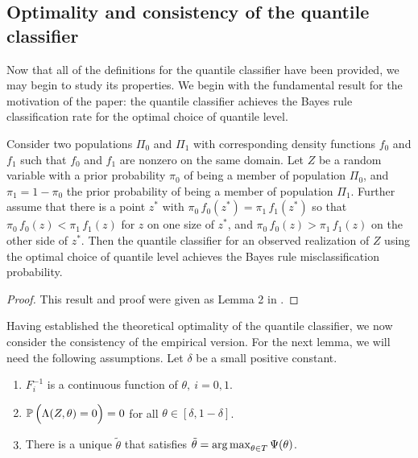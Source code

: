 \subsection{Optimality and consistency of the quantile classifier}
\label{sec:quantile-classifier-optimality}

Now that all of the definitions for the quantile classifier have been provided,
we may begin to study its properties.  We begin with the fundamental result for
the motivation of the paper: the quantile classifier achieves the Bayes rule
classification rate for the optimal choice of quantile level.

\begin{theorem}
  \label{thm:quantile-classifier-is-bayes}
  Consider two populations $\Pi_0$ and $\Pi_1$ with corresponding density
  functions $f_0$ and $f_1$ such that $f_0$ and $f_1$ are nonzero on the same
  domain.  Let $Z$ be a random variable with a prior probability $\pi_0$ of
  being a member of population $\Pi_0$, and $\pi_1 = 1 - \pi_0$ the prior
  probability of being a member of population $\Pi_1$.  Further assume that
  there is a point $z^{*}$ with $\pi_0\, f_0(z^{*}) = \pi_1\, f_1(z^{*})$ so
  that $\pi_0\, f_0(z) < \pi_1\, f_1(z)$ for $z$ on one size of $z^{*}$, and
  $\pi_0\, f_0(z) > \pi_1\, f_1(z)$ on the other side of $z^{*}$.  Then the
  quantile classifier for an observed realization of $Z$ using the optimal
  choice of quantile level achieves the Bayes rule misclassification
  probability.
\end{theorem}

\begin{proof}
  This result and proof were given as Lemma 2 in \cite{hennig2016}.
\end{proof}

Having established the theoretical optimality of the quantile classifier, we now
consider the consistency of the empirical version.  For the next lemma, we will
need the following assumptions.  Let $\delta$ be a small positive constant.
\begin{enumerate}[label=\emph{Assumption \arabic*.}, align=left]
\item $F_i^{-1}$ is a continuous function of
  $\theta,~ i=0,1$.
\item $\mathbb{P}\,\Big( \Lambda(Z, \theta) = 0 \Big) = 0$ for all
  $\theta \in [\delta, 1 - \delta]$.
\item There is a unique $\tilde{\theta}$ that satisfies $\tilde{\theta} =
  \operatorname*{arg\,max}_{\theta \in T} \Psi(\theta)$.
\end{enumerate}

